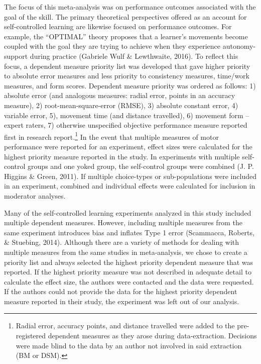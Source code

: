 \documentclass[
  english,
  man, donotrepeattitle,floatsintext]{apa7}
\begin{document}
The focus of this meta-analysis was on performance outcomes associated with the goal of the skill. The primary theoretical perspectives offered as an account for self-controlled learning are likewise focused on performance outcomes. For example, the ``OPTIMAL'' theory proposes that a learner's movements become coupled with the goal they are trying to achieve when they experience autonomy-support during practice (Gabriele Wulf \& Lewthwaite, 2016). To reflect this focus, a dependent measure priority list was developed that gave higher priority to absolute error measures and less priority to consistency measures, time/work measures, and form scores. Dependent measure priority was ordered as follows: 1) absolute error (and analogous measures: radial error, points in an accuracy measure), 2) root-mean-square-error (RMSE), 3) absolute constant error, 4) variable error, 5), movement time (and distance travelled), 6) movement form -- expert raters, 7) otherwise unspecified objective performance measure reported first in research report.\footnote{Radial error, accuracy points, and distance travelled were added to the pre-registered dependent measures as they arose during data-extraction. Decisions were made blind to the data by an author not involved in said extraction (BM or DSM).} In the event that multiple measures of motor performance were reported for an experiment, effect sizes were calculated for the highest priority measure reported in the study. In experiments with multiple self-control groups and one yoked group, the self-control groups were combined (J. P. Higgins \& Green, 2011). If multiple choice-types or sub-populations were included in an experiment, combined and individual effects were calculated for inclusion in moderator analyses.

Many of the self-controlled learning experiments analyzed in this study included multiple dependent measures. However, including multiple measures from the same experiment introduces bias and inflates Type 1 error (Scammacca, Roberts, \& Stuebing, 2014). Although there are a variety of methods for dealing with multiple measures from the same studies in meta-analysis, we chose to create a priority list and always selected the highest priority dependent measure that was reported. If the highest priority measure was not described in adequate detail to calculate the effect size, the authors were contacted and the data were requested. If the authors could not provide the data for the highest priority dependent measure reported in their study, the experiment was left out of our analysis.
\end{document}
